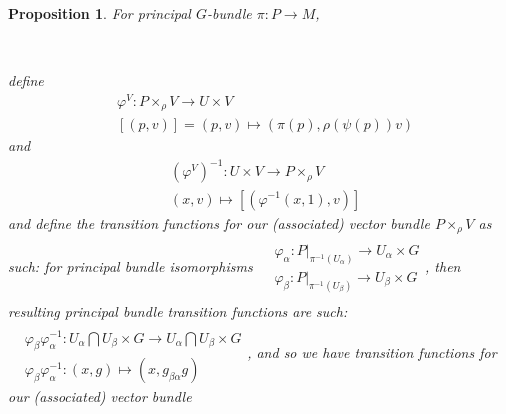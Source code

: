 \documentclass[10pt]{amsart}
\newtheorem{proposition}{Proposition}
\begin{document}
\begin{multicols*}{2}
\begin{proposition}
For principal $G$-bundle $\pi : P \to M$, 

 \,  define 
\[
\begin{aligned}
  & \varphi^V : P\times_{\rho} V \to U\times V \\ 
  & [(p,v)] =(p,v) \mapsto (\pi(p),\rho(\psi(p))v)
\end{aligned}
\]
and 
\[
\begin{aligned}
  & (\varphi^V)^{-1} : U\times V \to P\times_{\rho}V \\ 
  & (x,v) \mapsto [(\varphi^{-1}(x,1),v) ]
\end{aligned}
\]
and define the transition functions for our (associated) vector bundle $P\times_{\rho}V$ as such: for principal bundle isomorphisms $\begin{aligned} & \quad \\
  & \varphi_{\alpha} : \left. P \right|_{\pi^{-1}(U_{\alpha})} \to U_{\alpha} \times G \\
  & \varphi_{\beta} : \left. P \right|_{\pi^{-1}(U_{\beta})} \to U_{\beta} \times G \\
\end{aligned}$, then resulting principal bundle transition functions are such: $\begin{aligned} & \quad \\
  & \varphi_{\beta} \varphi_{\alpha}^{-1} : U_{\alpha} \bigcap U_{\beta} \times G \to U_{\alpha} \bigcap U_{\beta} \times G \\
  & \varphi_{\beta} \varphi_{\alpha}^{-1} : (x,g) \mapsto (x,g_{\beta \alpha} g) \end{aligned}$, and so we have transition functions for our (associated) vector bundle 


\end{proposition}
\end{multicols*}
\end{document}

